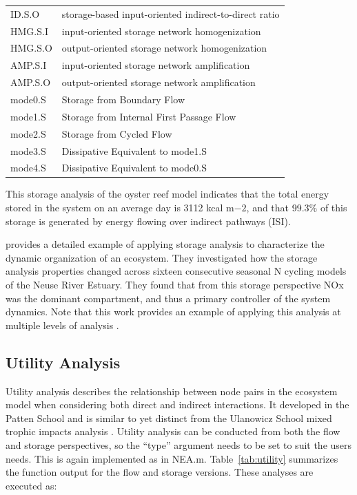 \documentclass[article]{jss}
\begin{document}
\begin{table}[]
\begin{small}
\begin{tabular}{l l}
      ID.S.O & storage-based input-oriented indirect-to-direct ratio \citep[as in][]{fath06}\\
      HMG.S.I & input-oriented storage network homogenization \\
      HMG.S.O & output-oriented storage network homogenization\\
      AMP.S.I &  input-oriented storage network amplification \\
      AMP.S.O & output-oriented storage network amplification \\
      mode0.S & Storage from Boundary Flow \\
      mode1.S & Storage from Internal First Passage Flow \\
      mode2.S & Storage from Cycled Flow \\
      mode3.S & Dissipative Equivalent to mode1.S \\
      mode4.S & Dissipative Equivalent to mode0.S \\ \hline
    \end{tabular}
\end{small}
\end{table}


This storage analysis of the oyster reef model indicates that the
total energy stored in the system on an average day is 3112 kcal
m$-2$, and that 99.3\% of this storage is generated by energy flowing
over indirect pathways (ISI).

\citet{whipple2014} provides a detailed example of applying storage
analysis to characterize the dynamic organization of an ecosystem.
They investigated how the storage analysis properties
changed across sixteen consecutive seasonal N cycling models of the
Neuse River Estuary.  They found that from this storage perspective
NOx was the dominant compartment, and thus a primary controller of the
system dynamics.  Note that this work provides an example of applying
this analysis at multiple levels of analysis \citep[e.g.,][]{hines2014}.

\subsection{Utility Analysis}
Utility analysis describes the relationship between node pairs in the
ecosystem model when considering both direct and indirect
interactions.  It developed in the Patten School \citep{patten91,
  fath99_review} and is similar to yet distinct from the Ulanowicz
School mixed trophic impacts analysis \citep{ulanowicz90}.  Utility
analysis can be conducted from both the flow and storage perspectives,
so the ``type'' argument needs to be set to suit the users needs.
This is again implemented as in NEA.m.  Table~\ref{tab:utility}
summarizes the function output for the flow and storage
versions. These analyses are executed as:
\end{document}
